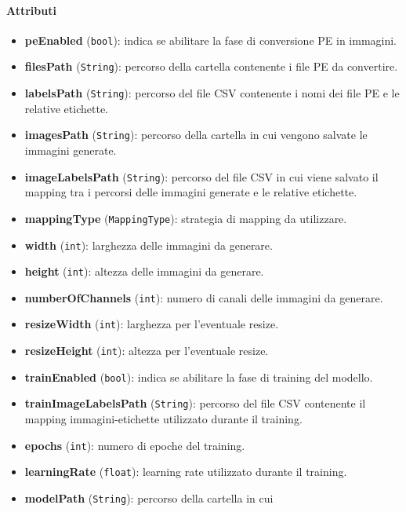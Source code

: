 \paragraph{Attributi}

\begin{itemize}
    \raggedright
    \item \textbf{peEnabled} (\texttt{bool}): indica se abilitare la fase di
    conversione PE in immagini.
    \item \textbf{filesPath} (\texttt{String}): percorso della cartella
    contenente i file PE da convertire.
    \item \textbf{labelsPath} (\texttt{String}): percorso del file CSV
    contenente i nomi dei file PE e le relative etichette.
    \item \textbf{imagesPath} (\texttt{String}): percorso della cartella in cui
    vengono salvate le immagini generate.
    \item \textbf{imageLabelsPath} (\texttt{String}): percorso del file CSV
    in cui viene salvato il mapping tra i percorsi delle immagini generate e
    le relative etichette.
    \item \textbf{mappingType} (\texttt{MappingType}): strategia di mapping da
    utilizzare.
    \item \textbf{width} (\texttt{int}): larghezza delle immagini da generare.
    \item \textbf{height} (\texttt{int}): altezza delle immagini da generare.
    \item \textbf{numberOfChannels} (\texttt{int}): numero di canali
    delle immagini da generare.
    \item \textbf{resizeWidth} (\texttt{int}): larghezza per l'eventuale resize.
    \item \textbf{resizeHeight} (\texttt{int}): altezza per l'eventuale resize.
    \item \textbf{trainEnabled} (\texttt{bool}): indica se abilitare la fase di
    training del modello.
    \item \textbf{trainImageLabelsPath} (\texttt{String}): percorso del file CSV
    contenente il mapping immagini-etichette utilizzato durante il training.
    \item \textbf{epochs} (\texttt{int}): numero di epoche del training.
    \item \textbf{learningRate} (\texttt{float}): learning rate utilizzato
    durante il training.
    \item \textbf{modelPath} (\texttt{String}): percorso della cartella in cui

\end{itemize}
